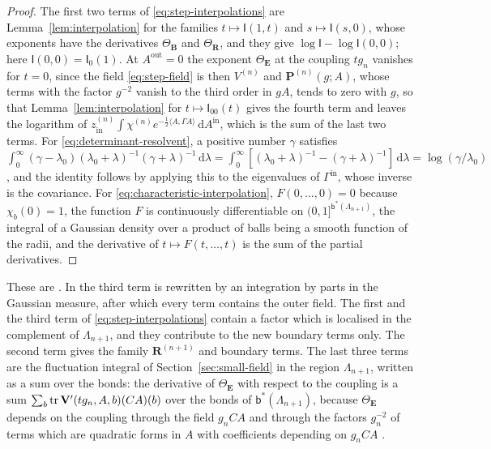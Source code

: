 \documentclass[11pt]{preprint}
\newcommand{\dd}{\mathrm{d}}
\numberwithin{equation}{section}
\begin{document}
\begin{proof}
The first two terms of \eqref{eq:step-interpolations} are Lemma~\ref{lem:interpolation} for the families $t \mapsto \mathsf I(1, t)$ and $s \mapsto \mathsf I(s, 0)$, whose exponents have the derivatives $\Theta_{\mathbf B}$ and $\Theta_{\mathbf R}$, and they give $\log\mathsf I - \log\mathsf I(0, 0)$; here $\mathsf I(0, 0) = \mathsf I_0(1)$. At $A^{\mathrm{out}} = 0$ the exponent $\Theta_{\mathbf E}$ at the coupling $tg_n$ vanishes for $t = 0$, since the field \eqref{eq:step-field} is then $V^{(n)}$ and $\mathbf P^{(n)}(g; A)$, whose terms with the factor $g^{-2}$ vanish to the third order in $gA$, tends to zero with $g$, so that Lemma~\ref{lem:interpolation} for $t \mapsto \mathsf I_{00}(t)$ gives the fourth term and leaves the logarithm of $z^{(n)}_{\mathrm{in}}\int\chi^{(n)}e^{-\frac{1}{2}\langle A, \Gamma A\rangle}\,\dd A^{\mathrm{in}}$, which is the sum of the last two terms. For \eqref{eq:determinant-resolvent}, a positive number $\gamma$ satisfies $\int_0^\infty(\gamma - \lambda_0)(\lambda_0 + \lambda)^{-1}(\gamma + \lambda)^{-1}\,\dd\lambda = \int_0^\infty[(\lambda_0 + \lambda)^{-1} - (\gamma + \lambda)^{-1}]\,\dd\lambda = \log(\gamma/\lambda_0)$, and the identity follows by applying this to the eigenvalues of $\Gamma^{\mathrm{in}}$, whose inverse is the covariance. For \eqref{eq:characteristic-interpolation}, $F(0, \dots, 0) = 0$ because $\chi_b(0) = 1$, the function $F$ is continuously differentiable on $(0, 1]^{\mathsf b^*(\Lambda_{n+1})}$, the integral of a Gaussian density over a product of balls being a smooth function of the radii, and the derivative of $t \mapsto F(t, \dots, t)$ is the sum of the partial derivatives.
\end{proof}

These are \cite[(3.26), (3.28), (3.30), (3.32)--(3.36)]{BalabanCRE}. In \cite[(3.28)]{BalabanCRE} the third term is rewritten by an integration by parts in the Gaussian measure, after which every term contains the outer field. The first and the third term of \eqref{eq:step-interpolations} contain a factor which is localised in the complement of $\Lambda_{n+1}$, and they contribute to the new boundary terms only. The second term gives the family $\mathbf R^{(n+1)}$ and boundary terms. The last three terms are the fluctuation integral of Section~\ref{sec:small-field} in the region $\Lambda_{n+1}$, written as a sum over the bonds: the derivative of $\Theta_{\mathbf E}$ with respect to the coupling is a sum $\sum_b\operatorname{tr}\mathbf V'(tg_n, A, b)(CA)(b)$ over the bonds of $\mathsf b^*(\Lambda_{n+1})$, because $\Theta_{\mathbf E}$ depends on the coupling through the field $g_nCA$ and through the factors $g_n^{-2}$ of terms which are quadratic forms in $A$ with coefficients depending on $g_nCA$ \cite[(3.31)]{BalabanCRE}.
\end{document}
